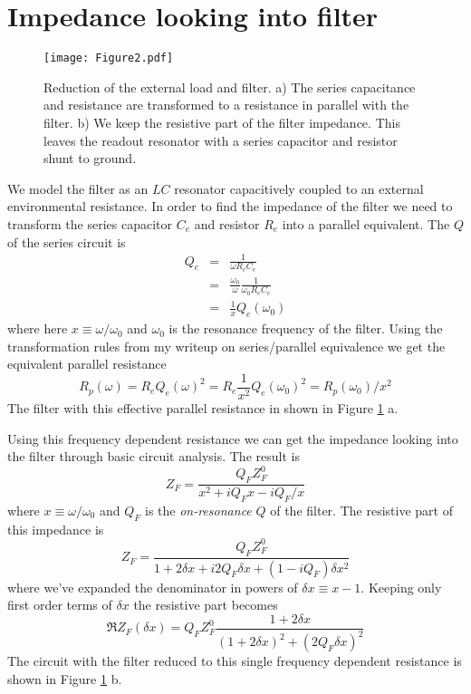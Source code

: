 \documentclass[english,aps,prl]{revtex4}
\begin{document}
\section{Impedance looking into filter}

\begin{figure}
\begin{centering}
\texttt{[image: Figure2.pdf]} 
\par\end{centering}
\caption{Reduction of the external load and filter. a) The series capacitance and resistance are transformed to a resistance in parallel with the filter. b) We keep the resistive part of the filter impedance. This leaves the readout resonator with a series capacitor and resistor shunt to ground.}
\label{Fig:2}
\end{figure}

We model the filter as an $LC$ resonator capacitively coupled to an external environmental resistance. In order to find the impedance of the filter we need to transform the series capacitor $C_e$ and resistor $R_e$ into a parallel equivalent. The $Q$ of the series circuit is \begin{eqnarray}
Q_e &=& \frac{1}{\omega R_e C_e} \\
&=& \frac{\omega_0}{\omega} \frac{1}{\omega_0 R_e C_e} \\
&=& \frac{1}{x} Q_e(\omega_0) \end{eqnarray}
where here $x\equiv \omega/\omega_0$ and $\omega_0$ is the resonance frequency of the filter. Using the transformation rules from my writeup on series/parallel equivalence we get the equivalent parallel resistance \begin{equation}
R_p(\omega) = R_e Q_e(\omega)^2 = R_e \frac{1}{x^2}Q_e(\omega_0)^2 = R_p(\omega_0)/x^2 \end{equation}
The filter with this effective parallel resistance in shown in Figure \ref{Fig:2} a.

Using this frequency dependent resistance we can get the impedance looking into the filter through basic circuit analysis. The result is \begin{equation}
Z_F = \frac{Q_F Z_F^0}{x^2 + iQ_F x - iQ_F/x} \end{equation}
where $x\equiv \omega/\omega_0$ and $Q_F$ is the \emph{on-resonance} $Q$ of the filter. The resistive part of this impedance is \begin{equation}
Z_F = \frac{Q_F Z_F^0}{1+2\delta x + i2Q_F \delta x + (1-iQ_F)\delta x^2}
\end{equation}
where we've expanded the denominator in powers of $\delta x \equiv x-1$. Keeping only first order terms of $\delta x$ the resistive part becomes \begin{equation}
\Re Z_F(\delta x) = Q_F Z_F^0 \frac{1+2\delta x}{(1+2\delta x)^2 + (2Q_F \delta x)^2} \end{equation}
The circuit with the filter reduced to this single frequency dependent resistance is shown in Figure \ref{Fig:2} b.
\end{document}
